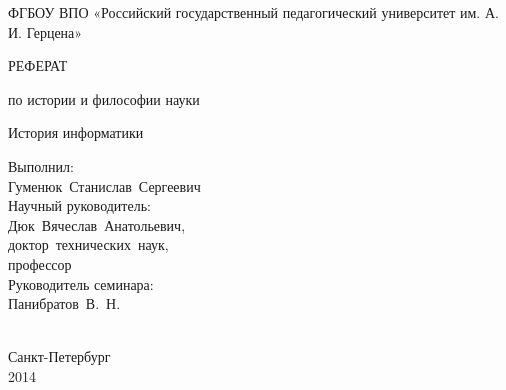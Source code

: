 \thispagestyle{empty}

\begin{center}
ФГБОУ ВПО «Российский государственный педагогический университет
им. А. И. Герцена» \par 
\par
\end{center}



\vspace{50mm}

\begin{center}
РЕФЕРАТ 

по истории и философии науки 

История информатики 

\end{center}

\vspace{20mm}
\begin{flushright}
\begin{minipage}
{0.4\textwidth} 
Выполнил:\\
Гуменюк~Станислав~Сергеевич\\ 

Научный руководитель: \\
Дюк~Вячеслав~Анатольевич,\\
доктор~технических~наук,\\
профессор\\

Руководитель семинара: \\
Панибратов~В.~Н.\\
\\[0.3cm] 
\end{minipage}

\end{flushright}

\vfill
\begin{center}
{Санкт-Петербург \\ 2014}
\end{center}

\newpage